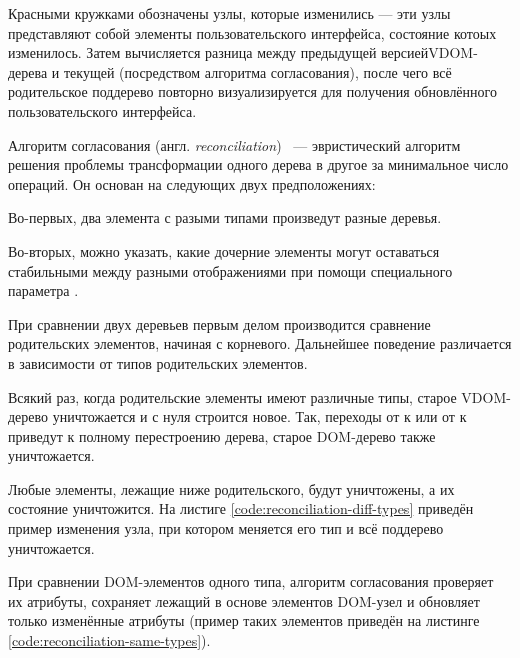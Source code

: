 Красными кружками обозначены узлы, которые изменились --- эти узлы представляют собой элементы пользовательского интерфейса, состояние котоых изменилось.
Затем вычисляется разница между предыдущей версией\break VDOM-дерева и текущей (посредством алгоритма согласования), после чего всё родительское поддерево повторно визуализируется для получения обновлённого пользовательского интерфейса.


Алгоритм согласования (англ. \textit{reconciliation})~\cite{reconciliation} --- эвристический алгоритм решения проблемы трансформации одного дерева в другое за минимальное число операций.
Он основан на следующих двух предположениях:

Во-первых, два элемента с разыми типами произведут разные деревья.

Во-вторых, можно указать, какие дочерние элементы могут оставаться стабильными между разными отображениями при помощи специального параметра .

При сравнении двух деревьев первым делом производится сравнение родительских элементов, начиная с корневого.
Дальнейшее поведение различается в зависимости от типов родительских элементов.

Всякий раз, когда родительские элементы имеют различные типы, старое VDOM-дерево уничтожается и с нуля строится новое.
Так, переходы от  к  или от  к  приведут к полному перестроению дерева, старое DOM-дерево также уничтожается.

Любые элементы, лежащие ниже родительского, будут уничтожены, а их состояние уничтожится.
На листиге \ref{code:reconciliation-diff-types} приведён пример изменения узла, при котором меняется его тип и всё поддерево уничтожается.


При сравнении DOM-элементов одного типа, алгоритм согласования проверяет их атрибуты, сохраняет лежащий в основе элементов DOM-узел и обновляет только изменённые атрибуты (пример таких элементов приведён на листинге \ref{code:reconciliation-same-types}).

